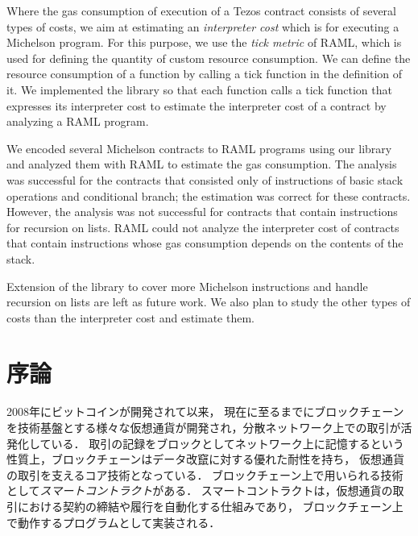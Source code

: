 \documentclass{kuisthesis}
\begin{document}
\begin{eabstract}
Where the gas consumption of execution of a Tezos contract consists of several types of costs, we aim at estimating an \emph{interpreter cost} which is for executing a Michelson program.
For this purpose, we use the \emph{tick metric} of RAML, which is used for defining the quantity of custom resource consumption.
We can define the resource consumption of a function by calling a tick function in the definition of it. 
We implemented the library so that each function calls a tick function that expresses its interpreter cost to estimate the interpreter cost of a contract by analyzing a RAML program.

We encoded several Michelson contracts to RAML programs using our library and analyzed them with RAML to estimate the gas consumption.
The analysis was successful for the contracts that consisted only of instructions of basic stack operations and conditional branch; the estimation was correct for these contracts.
However, the analysis was not successful for contracts that contain instructions for recursion on lists.
RAML could not analyze the interpreter cost of contracts that contain instructions whose gas consumption depends on the contents of the stack.

Extension of the library to cover more Michelson instructions and handle recursion on lists are left as future work.
We also plan to study the other types of costs than the interpreter cost and estimate them.


\end{eabstract}

\tableofcontents

\section{序論}\label{sec-intro}
2008年にビットコインが開発されて以来\cite{bitcoin}，
現在に至るまでにブロックチェーンを技術基盤とする様々な仮想通貨が開発され，分散ネットワーク上での取引が活発化している．
取引の記録をブロックとしてネットワーク上に記憶するという性質上，ブロックチェーンはデータ改竄に対する優れた耐性を持ち，
仮想通貨の取引を支えるコア技術となっている．
ブロックチェーン上で用いられる技術として\emph{スマートコントラクト}がある．
スマートコントラクトは，仮想通貨の取引における契約の締結や履行を自動化する仕組みであり，
ブロックチェーン上で動作するプログラムとして実装される．
\end{document}
